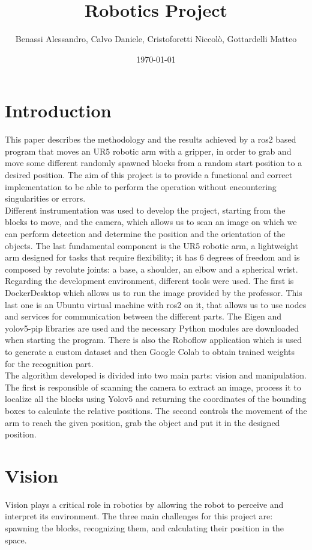\documentclass[12pt,a4paper]{article}
\title{Robotics Project}
\author{Benassi Alessandro, Calvo Daniele, Cristoforetti Niccolò, Gottardelli Matteo}
\date{\today}
\begin{document}
\maketitle
\tableofcontents
\newpage

\section{Introduction}\label{sec:intro}
This paper describes the methodology and the results achieved by a ros2 based program that moves an UR5 robotic arm with a gripper, in order to grab and move some different randomly spawned blocks from a random start position to a desired position. The aim of this project is to provide a functional and correct implementation to be able to perform the operation without encountering singularities or errors.\\
Different instrumentation was used to develop the project, starting from the blocks to move, and the camera, which allows us to scan an image on which we can perform detection and determine the position and the orientation of the objects. The last fundamental component is the UR5 robotic arm, a lightweight arm designed for tasks that require flexibility; it has 6 degrees of freedom and is composed by revolute joints: a base, a shoulder, an elbow and a spherical wrist.\\
Regarding the development environment, different tools were used. The first is DockerDesktop which allows us to run the image provided by the professor. This last one is an Ubuntu virtual machine with ros2 on it, that allows us to use nodes and services for communication between the different parts. The Eigen and yolov5-pip libraries are used and the necessary Python modules are downloaded when starting the program. There is also the Roboflow application which is used to generate a custom dataset and then Google Colab to obtain trained weights for the recognition part.\\ 
The algorithm developed is divided into two main parts: vision and manipulation. The first is responsible of scanning the camera to extract an image, process it to localize all the blocks using Yolov5 and returning the coordinates of the bounding boxes to calculate the relative positions. The second controls the movement of the arm to reach the given position, grab the object and put it in the designed position.


\section{Vision}\label{sec:vision}
Vision plays a critical role in robotics by allowing the robot to perceive and interpret its environment. 
The three main challenges for this project are: spawning the blocks, recognizing them, and calculating their position in the space.
\end{document}

